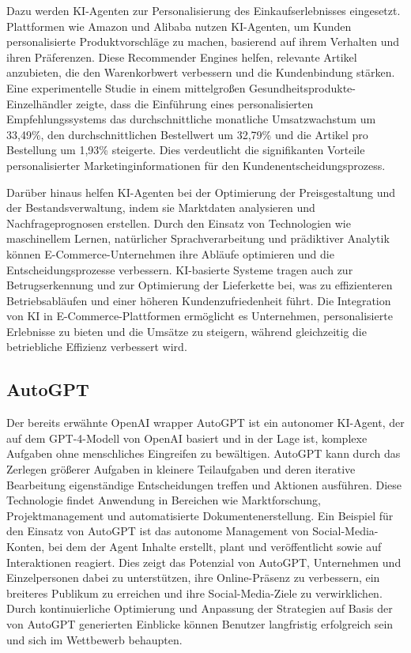 \documentclass[conference]{IEEEtran}
\begin{document}
Dazu werden KI-Agenten zur Personalisierung des Einkaufserlebnisses eingesetzt. Plattformen wie Amazon und Alibaba nutzen KI-Agenten, um Kunden personalisierte Produktvorschläge zu machen, basierend auf ihrem Verhalten und ihren Präferenzen. Diese Recommender Engines helfen, relevante Artikel anzubieten, die den Warenkorbwert verbessern und die Kundenbindung stärken. Eine experimentelle Studie in einem mittelgroßen Gesundheitsprodukte-Einzelhändler zeigte, dass die Einführung eines personalisierten Empfehlungssystems das durchschnittliche monatliche Umsatzwachstum um 33,49\%, den durchschnittlichen Bestellwert um 32,79\% und die Artikel pro Bestellung um 1,93\% steigerte. Dies verdeutlicht die signifikanten Vorteile personalisierter Marketinginformationen für den Kundenentscheidungsprozess\cite{behera_personalized_2020}.

Darüber hinaus helfen KI-Agenten bei der Optimierung der Preisgestaltung und der Bestandsverwaltung, indem sie Marktdaten analysieren und Nachfrageprognosen erstellen. Durch den Einsatz von Technologien wie maschinellem Lernen, natürlicher Sprachverarbeitung und prädiktiver Analytik können E-Commerce-Unternehmen ihre Abläufe optimieren und die Entscheidungsprozesse verbessern. KI-basierte Systeme tragen auch zur Betrugserkennung und zur Optimierung der Lieferkette bei, was zu effizienteren Betriebsabläufen und einer höheren Kundenzufriedenheit führt. Die Integration von KI in E-Commerce-Plattformen ermöglicht es Unternehmen, personalisierte Erlebnisse zu bieten und die Umsätze zu steigern, während gleichzeitig die betriebliche Effizienz verbessert wird\cite{misischia_chatbots_2022}.

\subsection{AutoGPT}

Der bereits erwähnte OpenAI wrapper AutoGPT ist ein autonomer KI-Agent, der auf dem GPT-4-Modell von OpenAI basiert und in der Lage ist, komplexe Aufgaben ohne menschliches Eingreifen zu bewältigen. AutoGPT kann durch das Zerlegen größerer Aufgaben in kleinere Teilaufgaben und deren iterative Bearbeitung eigenständige Entscheidungen treffen und Aktionen ausführen. Diese Technologie findet Anwendung in Bereichen wie Marktforschung, Projektmanagement und automatisierte Dokumentenerstellung. Ein Beispiel für den Einsatz von AutoGPT ist das autonome Management von Social-Media-Konten, bei dem der Agent Inhalte erstellt, plant und veröffentlicht sowie auf Interaktionen reagiert. Dies zeigt das Potenzial von AutoGPT, Unternehmen und Einzelpersonen dabei zu unterstützen, ihre Online-Präsenz zu verbessern, ein breiteres Publikum zu erreichen und ihre Social-Media-Ziele zu verwirklichen\cite{pogla_ultimate_2024}. Durch kontinuierliche Optimierung und Anpassung der Strategien auf Basis der von AutoGPT generierten Einblicke können Benutzer langfristig erfolgreich sein und sich im Wettbewerb behaupten.
\end{document}
